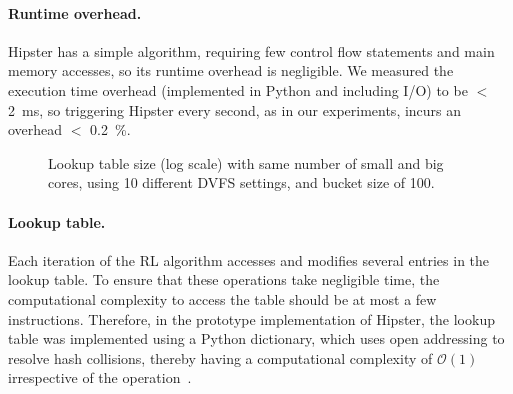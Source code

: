 \vspace{-1mm}

 \paragraph{Runtime overhead.} Hipster has a simple algorithm, requiring few control flow
statements and main memory accesses, so its runtime overhead is negligible.  We measured
the execution time overhead (implemented in Python and including I/O) to be $<$ \enspace
\SI{2}{\milli\second}, so triggering Hipster every second, as in our experiments, incurs
an overhead $<$ \enspace \SI{0.2}{\percent}.

\begin{figure}
    \vspace{-17mm}
    \vspace{0mm}
    \caption[Lookup table size in \SI{}{\kilo\byte}]{Lookup table size (log scale) with same number of small and big cores, using 10 different DVFS settings, and bucket size of 100.}
    \vspace{-3mm}
    \label{fig:size}
\end{figure}

 \paragraph{Lookup table.} Each iteration of the RL algorithm accesses and modifies several
entries in the lookup table. To ensure that these operations take negligible time, the
computational complexity to access the table should be at most a few instructions.
Therefore, in the prototype implementation of Hipster, the lookup table was implemented
using a Python dictionary, which uses open addressing to resolve hash collisions, thereby
having a computational complexity of $\mathcal{O}(1)$ irrespective of the
operation~\citep{PattisComplexityHttps://www.ics.uci.edu/pattis/ICS-33/lectures/complexitypython.txt}.

